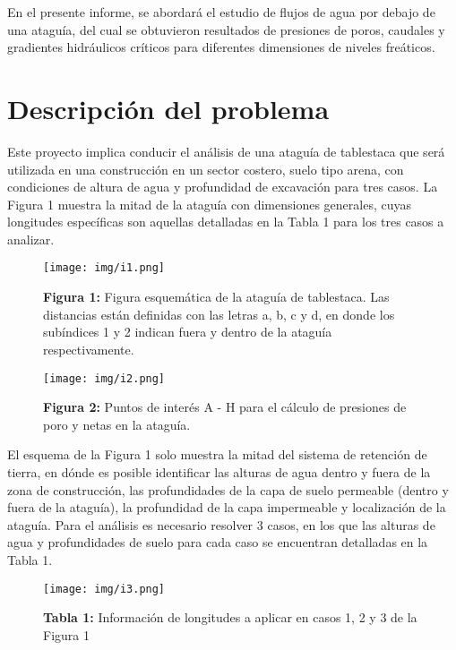 \documentclass{article} %
\begin{document}
En el presente informe, se abordará el estudio de flujos de agua por debajo de una ataguía,
del cual se obtuvieron resultados de presiones de poros, caudales y gradientes hidráulicos críticos
para diferentes dimensiones de niveles freáticos.

\newpage

\section{Descripción del problema}

Este proyecto implica conducir el análisis de una ataguía de tablestaca que será utilizada en una construcción en un sector costero, suelo tipo arena, con condiciones de altura de agua y profundidad de excavación para tres casos. La Figura 1 muestra la mitad de la ataguía con dimensiones generales, cuyas longitudes específicas son aquellas detalladas en la Tabla 1 para los tres casos a analizar.

\begin{figure}[htbp]
    \centering
    \texttt{[image: img/i1.png]}
    \caption*{\textbf{Figura 1:} Figura esquemática de la ataguía de tablestaca. Las distancias están definidas con las letras a, b, c y d, en donde los subíndices 1 y 2 indican fuera y dentro de la ataguía respectivamente.}
\end{figure}

\begin{figure}[htbp]
    \centering
    \texttt{[image: img/i2.png]}
    \caption*{\textbf{Figura 2:} Puntos de interés A - H para el cálculo de presiones de poro y netas en la ataguía.}
\end{figure}

El esquema de la Figura 1 solo muestra la mitad del sistema de retención de tierra, en dónde es posible identificar las alturas de agua dentro y fuera de la zona de construcción, las profundidades de la capa de suelo permeable (dentro y fuera de la ataguía), la profundidad de la capa impermeable y localización de la ataguía. Para el análisis es necesario resolver 3 casos, en los que las alturas de agua y profundidades de suelo para cada caso se encuentran detalladas en la Tabla 1.

\begin{figure}[htbp]
    \centering
    \caption*{\textbf{Tabla 1:} Información de longitudes a aplicar en casos 1, 2 y 3 de la Figura 1}
    \texttt{[image: img/i3.png]}
\end{figure}
\end{document}
